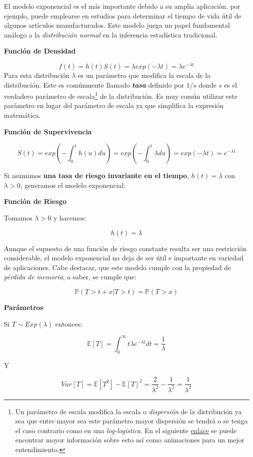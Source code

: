 \documentclass[
  a4paper,
  oneside,
  openany]{book}
\begin{document}
El modelo exponencial es el más importante debido a su amplia aplicación, por ejemplo, puede emplearse en estudios para determinar el tiempo de vida útil de algunos artículos manufacturados. Este modelo juega un papel fundamental análogo a la \emph{distribución normal} en la inferencia estadística tradicional.

\textbf{Función de Densidad}

\[
f(t)=h(t)S(t)=\lambda exp(-\lambda t)=\lambda e^{-\lambda t}
\]
Para esta distribución \(\lambda\) es un parámetro que modifica la escala de la distribución. Este es comúnmente llamado \textbf{\emph{tasa}} definido por \(1/s\) donde \(s\) es el verdadero parámetro de escala\footnote{Un parámetro de escala modifica la escala o \emph{dispersión} de la distribución ya sea que entre mayor sea este parámetro mayor dispersión se tendrá o se tenga el caso contrario como en una \emph{log-logistica}. En el siguiente \href{https://en.wikipedia.org/wiki/Scale_parameter}{enlace} se puede encontrar mayor información sobre esto así como animaciones para un mejor entendimiento.} de la distribución. Es muy común utilizar este parámetro en lugar del parámetro de escala ya que simplifica la expresión matemática.

\textbf{Función de Supervivencia}

\[
S(t)=exp\left(-\int_0^{t}h(u)du\right)=exp\left(-\int_0^{t}\lambda du\right)=exp(-\lambda t)=e^{-\lambda t}
\]

Si asumimos \textbf{una tasa de riesgo invariante en el tiempo}, \(h(t)=\lambda\) con \(\lambda>0\), generamos el modelo exponencial:

\textbf{Función de Riesgo}

Tomamos \(\lambda>0\) y hacemos:

\[
h(t)=\lambda
\]

Aunque el supuesto de una función de riesgo constante resulta ser una restricción considerable, el modelo exponencial no deja de ser útil e importante en variedad de aplicaciones. Cabe destacar, que este modelo cumple con la propiedad de \emph{pérdida de memoria}; a saber, se cumple que:

\[
\mathbb{P}(T>t+x|T>t)=\mathbb{P}(T>x)
\]

\textbf{Parámetros}

Si \(T\sim Exp(\lambda)\) entonces:

\[
\mathbb{E}[T]=\int_{0}^{\infty}t\lambda e^{-\lambda t}dt=\frac{1}{\lambda}
\]

Y

\[
Var[T]=\mathbb{E}[T^2]-\mathbb{E}[T]^2=\frac{2}{\lambda^2}-\frac{1}{\lambda^2}=\frac{1}{\lambda^2}
\]
\end{document}

